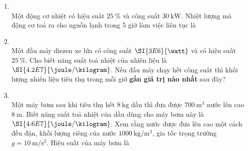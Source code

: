 \begin{enumerate}[label=\bfseries Câu \arabic*:, leftmargin=1.7cm]
\item {}\\
Một động cơ nhiệt có hiệu suất $\SI{25}{\percent}$ và công suất $\SI{30}{\kilo\watt}$. Nhiệt lượng mà động cơ toả ra cho nguồn lạnh trong 5 giờ làm việc liên tục là

\item {}\\
Một đầu máy diezen xe lửa có công suất $\SI{3E6}{\watt}$ và có hiệu suất $\SI{25}{\percent}$. Cho biết năng suất toả nhiệt của nhiên liệu là $\SI{4.2E7}{\joule/\kilogram}$. Nếu đầu máy chạy hết công suất thì khối lượng nhiên liệu tiêu thụ trong mỗi giờ \textbf{gần giá trị nào nhất} sau đây?

\item {}\\
Một máy bơm sau khi tiêu thụ hết $\SI{8}{\kilogram}$ dầu thì đưa được $\SI{700}{\meter^3}$ nước lên cao $\SI{8}{\meter}$. Biết năng suất toả nhiệt của dầu dùng cho  máy bơm này là $\SI{4.6E7}{\joule/\kilogram}$. Xem rằng nước được đưa lên cao một cách đều đặn, khối lượng riêng của nước $\SI{1000}{\kilogram/\meter^3}$, gia tốc trọng trường $g=\SI{10}{\meter/\second^2}$. Hiệu suất của máy bơm là


\end{enumerate}
